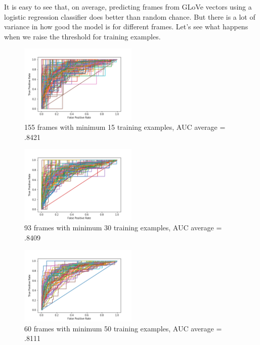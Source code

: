 \documentclass[a4paper]{article}
\begin{document}
It is easy to see that, on average, predicting frames from GLoVe vectors using a logistic regression classifier does better than random chance. But there is a lot of variance in how good the model is for different frames. Let's see what happens when we raise the threshold for training examples.

\begin{figure}[H]
\centering
\includegraphics[width=0.5\textwidth]{auc_plot15.png}
\caption{\label{fig:frog} 155 frames with minimum 15 training examples, AUC average = .8421}
\end{figure}

\begin{figure}[H]
\centering
\includegraphics[width=0.5\textwidth]{auc_plot30.png}
\caption{\label{fig:frog} 93 frames with minimum 30 training examples, AUC average = .8409}
\end{figure}

\begin{figure}[H]
\centering
\includegraphics[width=0.5\textwidth]{auc_plot50.png}
\caption{\label{fig:frog} 60 frames with minimum 50 training examples, AUC average = .8111}
\end{figure}
\end{document}
